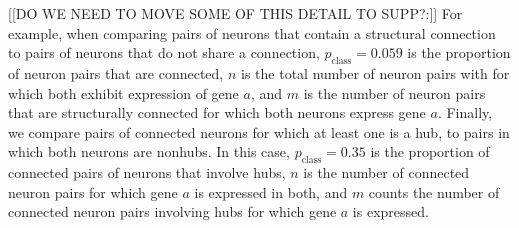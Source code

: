 \documentclass[10pt,letterpaper]{article}
\begin{document}
[[DO WE NEED TO MOVE SOME OF THIS DETAIL TO SUPP?:]]
For example, when comparing pairs of neurons that contain a structural connection to pairs of neurons that do not share a connection, $p_\mathrm{class} = 0.059$ is the proportion of neuron pairs that are connected, $n$ is the total number of neuron pairs with for which both exhibit expression of gene $a$, and $m$ is the number of neuron pairs that are structurally connected for which both neurons express gene $a$.
Finally, we compare pairs of connected neurons for which at least one is a hub, to pairs in which both neurons are nonhubs.
In this case, $p_\mathrm{class} = 0.35$ is the proportion of connected pairs of neurons that involve hubs, $n$ is the number of connected neuron pairs for which gene $a$ is expressed in both, and $m$ counts the number of connected neuron pairs involving hubs for which gene $a$ is expressed.
\end{document}
